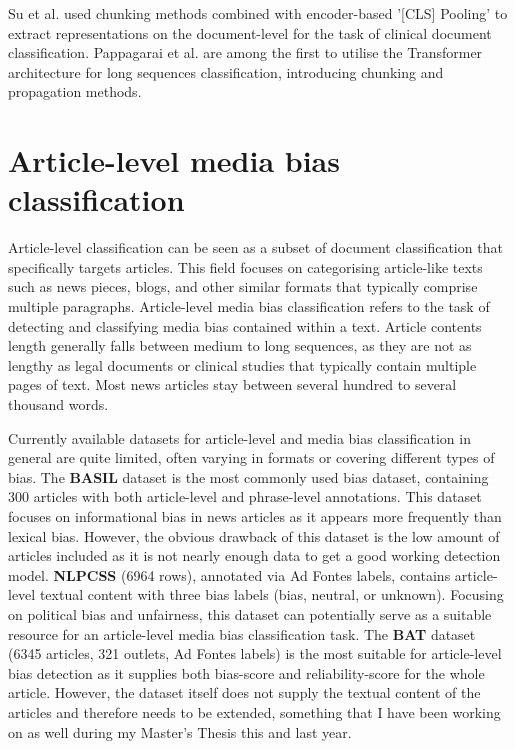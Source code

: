 Su et al. \cite{su-2021-classifying} used chunking methods combined with encoder-based '[CLS] Pooling' to extract representations on the document-level for the task of clinical document classification. Pappagarai et al. \cite{pappagari-2019-hierarchical} are among the first to utilise the Transformer architecture for long sequences classification, introducing chunking and propagation methods.


\section{Article-level media bias classification}
Article-level classification can be seen as a subset of document classification that specifically targets articles. This field focuses on categorising article-like texts such as news pieces, blogs, and other similar formats that typically comprise multiple paragraphs. Article-level media bias classification refers to the task of detecting and classifying media bias contained within a text. Article contents length generally falls between medium to long sequences, as they are not as lengthy as legal documents or clinical studies that typically contain multiple pages of text. Most news articles stay between several hundred to several thousand words.

Currently available datasets for article-level and media bias classification in general are quite limited, often varying in formats or covering different types of bias. The \textbf{BASIL} dataset \cite{fan-2019-basil} is the most commonly used bias dataset, containing 300 articles with both article-level and phrase-level annotations. This dataset focuses on informational bias in news articles as it appears more frequently than lexical bias. However, the obvious drawback of this dataset is the low amount of articles included as it is not nearly enough data to get a good working detection model. \textbf{NLPCSS} \cite{chen-2020-nlpcss} (6964 rows), annotated via Ad Fontes labels, contains article-level textual content with three bias labels (bias, neutral, or unknown). Focusing on political bias and unfairness, this dataset can potentially serve as a suitable resource for an article-level media bias classification task. The \textbf{BAT} \cite{spinde-2023-bat} dataset (6345 articles, 321 outlets, Ad Fontes labels) is the most suitable for article-level bias detection as it supplies both bias-score and reliability-score for the whole article. However, the dataset itself does not supply the textual content of the articles and therefore needs to be extended, something that I have been working on as well during my Master's Thesis this and last year.

